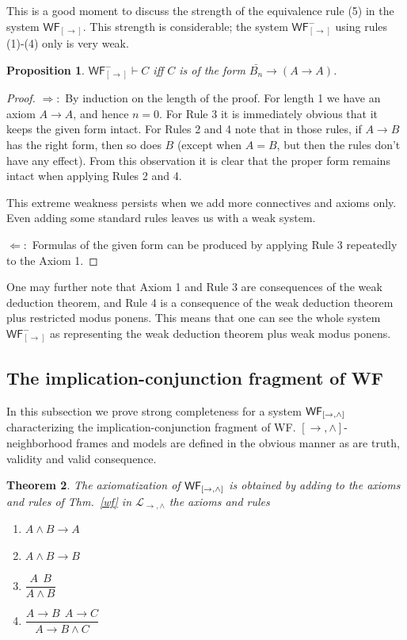 \documentclass[12pt]{article}
\newtheorem{thm}{Theorem}[section]
\newtheorem{prop}[thm]{Proposition}
\begin{document}
This is a good moment to discuss the strength of the equivalence rule (5) in the system $\mathsf{WF_{[\rightarrow]}}$. This strength is considerable; the system $\mathsf{WF_{[\rightarrow]}^-}$ using rules (1)-(4) only is very weak.
\begin{prop} $\mathsf{WF_{[\rightarrow]}^-}\vdash C$ iff $C$ is of the form $\bar{B_n}\rightarrow (A\rightarrow A)$.
\end{prop}
\begin{proof} $\Rightarrow:$ By induction on the length of the proof. For length 1 we have an axiom $A\rightarrow A$, and hence $n=0$. For Rule 3 it is immediately obvious that it keeps the given form intact. For Rules 2 and 4 note that in those rules, if $A\rightarrow B$ has the right form, then so does $B$ (except when $A=B$, but then the rules don't have any effect). From this observation it is clear that the proper form remains intact when applying Rules 2 and 4.

This extreme weakness persists when we add more connectives and axioms only. Even adding some standard rules leaves us with a weak system.

\noindent $\Leftarrow:$ Formulas of the given form can be produced by applying Rule 3 repeatedly to the Axiom 1.
\end{proof} 

One may further note that Axiom 1 and Rule 3 are consequences of the weak deduction theorem, and Rule 4 is a consequence of the weak deduction theorem plus restricted modus ponens. This means that one can see the whole system $\mathsf{WF_{[\rightarrow]}^-}$ as representing the weak deduction theorem plus weak modus ponens.




\subsection{The implication-conjunction fragment of {\sf WF}}
In this subsection we prove strong completeness for a system $ {\sf WF_{[\rightarrow, \wedge]}}  $ characterizing the implication-conjunction fragment of {\sf WF}. $[\rightarrow , \wedge]$-neighborhood frames and models are defined in the obvious manner as are truth, validity and valid consequence.


\begin{thm}
The axiomatization of $ {\sf WF_{[\rightarrow, \wedge]}}  $ is obtained by adding to the axioms and rules  of Thm.\ \ref{wf} in $\mathcal{L}_{\rightarrow,\wedge}$ the axioms and rules
\begin{enumerate}
\item[6.] $ A\wedge B\rightarrow A $
\item[7.] $ A\wedge B\rightarrow B $
\item[8.] $\dfrac{A~~B}{A\wedge B} $
\item[9.] $\dfrac{A\rightarrow B~~A\rightarrow C}{A\rightarrow B\wedge C}$
\end{enumerate}
\end{thm}
\end{document}
